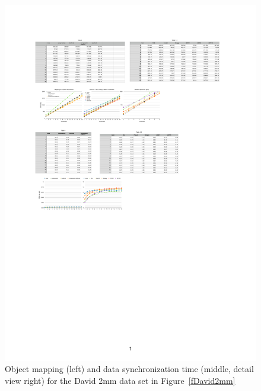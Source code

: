 \documentclass[10pt,journal,compsoc]{IEEEtran}
\newcommand{\fig}[1]{Figure~\ref{#1}}
\begin{document}
\begin{figure}[p!]\center
  \includegraphics[height=.19\textheight]{images/daviddist}
  \caption{\label{fDavidDist}Object mapping (left) and data synchronization
    time (middle, detail view right) for the David 2mm data set in
    \fig{fDavid2mm}}
\end{figure}
\end{document}

